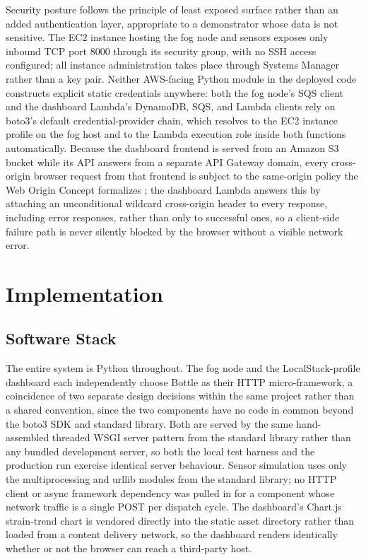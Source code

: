 \documentclass[conference]{IEEEtran}
\begin{document}
Security posture follows the principle of least exposed surface rather than an added authentication layer, appropriate to a demonstrator whose data is not sensitive. The EC2 instance hosting the fog node and sensors exposes only inbound TCP port 8000 through its security group, with no SSH access configured; all instance administration takes place through Systems Manager rather than a key pair. Neither AWS-facing Python module in the deployed code constructs explicit static credentials anywhere: both the fog node's SQS client and the dashboard Lambda's DynamoDB, SQS, and Lambda clients rely on boto3's default credential-provider chain, which resolves to the EC2 instance profile on the fog host and to the Lambda execution role inside both functions automatically. Because the dashboard frontend is served from an Amazon S3 bucket while its API answers from a separate API Gateway domain, every cross-origin browser request from that frontend is subject to the same-origin policy the Web Origin Concept formalizes \cite{ref9}; the dashboard Lambda answers this by attaching an unconditional wildcard cross-origin header to every response, including error responses, rather than only to successful ones, so a client-side failure path is never silently blocked by the browser without a visible network error.

\section{Implementation}

\subsection{Software Stack}

The entire system is Python throughout. The fog node and the LocalStack-profile dashboard each independently choose Bottle as their HTTP micro-framework, a coincidence of two separate design decisions within the same project rather than a shared convention, since the two components have no code in common beyond the boto3 SDK and standard library. Both are served by the same hand-assembled threaded WSGI server pattern from the standard library rather than any bundled development server, so both the local test harness and the production run exercise identical server behaviour. Sensor simulation uses only the multiprocessing and urllib modules from the standard library; no HTTP client or async framework dependency was pulled in for a component whose network traffic is a single POST per dispatch cycle. The dashboard's Chart.js strain-trend chart is vendored directly into the static asset directory rather than loaded from a content delivery network, so the dashboard renders identically whether or not the browser can reach a third-party host.
\end{document}
